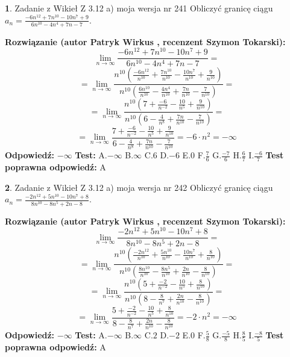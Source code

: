 \documentclass[12pt, a4paper]{article}
\theoremstyle{definition} %
\newtheorem{zad}{}
\newcommand{\zadStart}[1]{\begin{zad}#1\newline}
\newcommand{\zadStop}{\end{zad}}
\newcommand{\rozwStart}[2]{\noindent \textbf{Rozwiązanie (autor #1 , recenzent #2): }\newline}
\newcommand{\rozwStop}{\newline}
\newcommand{\odpStart}{\noindent \textbf{Odpowiedź:}\newline}
\newcommand{\odpStop}{\newline}
\newcommand{\testStart}{\noindent \textbf{Test:}\newline}
\newcommand{\testStop}{\newline}
\newcommand{\kluczStart}{\noindent \textbf{Test poprawna odpowiedź:}\newline}
\newcommand{\kluczStop}{\newline}
\begin{document}
\zadStart{Zadanie z Wikieł Z 3.12 a) moja wersja nr 241}
Obliczyć granicę ciągu $a_{n}=\frac{-6n^{12}+7n^{10}-10n^{7}+9}{6n^{10}-4n^{4}+7n-7}$.
\zadStop
\rozwStart{Patryk Wirkus}{Szymon Tokarski}
$$\lim\limits_{n\to\infty}\frac{-6n^{12}+7n^{10}-10n^{7}+9}{6n^{10}-4n^{4}+7n-7}=$$
$$=\lim\limits_{n\to\infty}\frac{n^{10}\left(\frac{-6n^{12}}{n^{10}}+\frac{7n^{10}}{n^{10}}-\frac{10n^{7}}{n^{10}}+\frac{9}{n^{10}}\right)}{n^{10}\left(\frac{6n^{10}}{n^{10}}-\frac{4n^{4}}{n^{10}}+\frac{7n}{n^{10}}-\frac{7}{n^{10}}\right)}=$$
$$=\lim\limits_{n\to\infty}\frac{n^{10}\left(7+\frac{-6}{n^{-2}}-\frac{10}{n^{5}}+\frac{9}{n^{10}}\right)}
{n^{10}\left(6-\frac{4}{n^{8}}+\frac{7n}{n^{10}}-\frac{7}{n^{10}}\right)}=$$
$$=\lim\limits_{n\to\infty}\frac{7+\frac{-6}{n^{-2}}-\frac{10}{n^{5}}+\frac{9}{n^{10}}}{6-\frac{4}{n^{8}}+\frac{7n}{n^{10}}-\frac{7}{n^{10}}}=-6\cdot n^{2} = -\infty$$
\rozwStop
\odpStart
$-\infty$
\odpStop
\testStart
A.$-\infty$
B.$\infty$
C.$6$
D.$-6$
E.$0$
F.$\frac{7}{6}$
G.$\frac{-7}{6}$
H.$\frac{6}{7}$
I.$\frac{-6}{7}$
\testStop
\kluczStart
A
\kluczStop



\zadStart{Zadanie z Wikieł Z 3.12 a) moja wersja nr 242}
Obliczyć granicę ciągu $a_{n}=\frac{-2n^{12}+5n^{10}-10n^{7}+8}{8n^{10}-8n^{5}+2n-8}$.
\zadStop
\rozwStart{Patryk Wirkus}{Szymon Tokarski}
$$\lim\limits_{n\to\infty}\frac{-2n^{12}+5n^{10}-10n^{7}+8}{8n^{10}-8n^{5}+2n-8}=$$
$$=\lim\limits_{n\to\infty}\frac{n^{10}\left(\frac{-2n^{12}}{n^{10}}+\frac{5n^{10}}{n^{10}}-\frac{10n^{7}}{n^{10}}+\frac{8}{n^{10}}\right)}{n^{10}\left(\frac{8n^{10}}{n^{10}}-\frac{8n^{5}}{n^{10}}+\frac{2n}{n^{10}}-\frac{8}{n^{10}}\right)}=$$
$$=\lim\limits_{n\to\infty}\frac{n^{10}\left(5+\frac{-2}{n^{-2}}-\frac{10}{n^{5}}+\frac{8}{n^{10}}\right)}
{n^{10}\left(8-\frac{8}{n^{7}}+\frac{2n}{n^{10}}-\frac{8}{n^{10}}\right)}=$$
$$=\lim\limits_{n\to\infty}\frac{5+\frac{-2}{n^{-2}}-\frac{10}{n^{5}}+\frac{8}{n^{10}}}{8-\frac{8}{n^{7}}+\frac{2n}{n^{10}}-\frac{8}{n^{10}}}=-2\cdot n^{2} = -\infty$$
\rozwStop
\odpStart
$-\infty$
\odpStop
\testStart
A.$-\infty$
B.$\infty$
C.$2$
D.$-2$
E.$0$
F.$\frac{5}{8}$
G.$\frac{-5}{8}$
H.$\frac{8}{5}$
I.$\frac{-8}{5}$
\testStop
\kluczStart
A
\kluczStop
\end{document}
